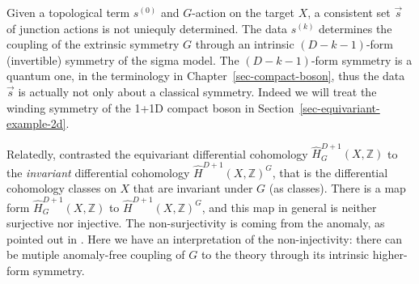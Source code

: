 \documentclass[
  letterpaper,
  DIV=11,
  numbers=noendperiod]{scrreport}
\begin{document}
\begin{tcolorbox}[enhanced jigsaw, opacityback=0, opacitybacktitle=0.6, leftrule=.75mm, arc=.35mm, coltitle=black, breakable, colframe=quarto-callout-note-color-frame, titlerule=0mm, colback=white, bottomrule=.15mm, left=2mm, colbacktitle=quarto-callout-note-color!10!white, toptitle=1mm, bottomtitle=1mm, title=\textcolor{quarto-callout-note-color}{\faInfo}\hspace{0.5em}{\(s^{(0)}\) does not fix \(s^{(k)}\), \(k\ge 1\).}, rightrule=.15mm, toprule=.15mm]

Given a topological term \(s^{(0)}\) and \(G\)-action on the target
\(X\), a consistent set \(\vec{s}\) of junction actions is not uniequly
determined. The data \(s^{(k)}\) determines the coupling of the
extrinsic symmetry \(G\) through an intrinsic \((D-k-1)\)-form
(invertible) symmetry of the sigma model.\footnotemark{} The
\((D-k-1)\)-form symmetry is a quantum one, in the terminology in
Chapter~\ref{sec-compact-boson}, thus the data \(\vec{s}\) is actually
not only about a classical symmetry. Indeed we will treat the winding
symmetry of the 1+1D compact boson in
Section~\ref{sec-equivariant-example-2d}.

Relatedly, \textcite{Davighi:2020vcm} contrasted the equivariant
differential cohomology \(\hat{H}_G^{D+1}(X,\mathbb{Z})\) to the
\emph{invariant} differential cohomology
\(\hat{H}^{D+1}(X,\mathbb{Z})^G\), that is the differential cohomology
classes on \(X\) that are invariant under \(G\) (as classes). There is a
map form \(\hat{H}_G^{D+1}(X,\mathbb{Z})\) to
\(\hat{H}^{D+1}(X,\mathbb{Z})^G\), and this map in general is neither
surjective nor injective. The non-surjectivity is coming from the
anomaly, as pointed out in \textcite{Davighi:2020vcm}. Here we have an
interpretation of the non-injectivity: there can be mutiple anomaly-free
coupling of \(G\) to the theory through its intrinsic higher-form
symmetry.

\end{tcolorbox}

\end{document}
